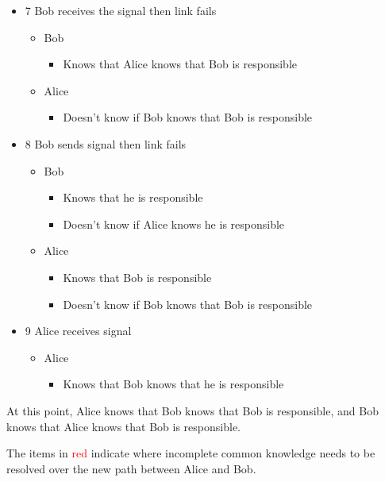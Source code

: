 \begin{itemize}
    \item 7 Bob receives the signal then link fails
    \begin{itemize}
        \item Bob
        \begin{itemize}
            \item Knows that Alice knows that Bob is responsible
        \end{itemize}
        \item Alice
        \begin{itemize}
            \item Doesn’t know if Bob knows that Bob is responsible
        \end{itemize}
    \end{itemize}

    \item 8 Bob sends signal then link fails
    \begin{itemize}
        \item Bob
        \begin{itemize}
            \item Knows that he is responsible
            \item Doesn’t know if Alice knows he is responsible
        \end{itemize}
        \item Alice
        \begin{itemize}
            \item Knows that Bob is responsible
            \item Doesn’t know if Bob knows that Bob is responsible
        \end{itemize}
    \end{itemize}

    \item 9 Alice receives signal
    \begin{itemize}
        \item Alice
        \begin{itemize}
            \item Knows that Bob knows that he is responsible
        \end{itemize}
    \end{itemize}
\end{itemize}

At this point, Alice knows that Bob knows that Bob is responsible, and Bob knows that
Alice knows that Bob is responsible.

The items in \textcolor{red}{red} indicate where incomplete common knowledge needs to be resolved
over the new path between Alice and Bob.

